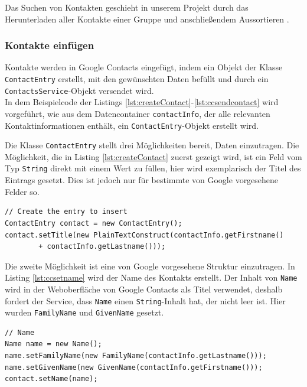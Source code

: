 Das Suchen von Kontakten geschieht in unserem Projekt durch das Herunterladen aller Kontakte
 einer Gruppe und anschließendem Aussortieren .

\FloatBarrier
\subsubsection{Kontakte einf\"ugen}
Kontakte werden in Google Contacts eingefügt, indem ein Objekt der Klasse
 \lstinline{ContactEntry} erstellt, mit den gewünschten Daten befüllt und durch ein
 \lstinline{ContactsService}-Objekt versendet wird.\\
In dem Beispielcode der Listings \ref{lst:createContact}-\ref{lst:ccsendcontact} wird
 vorgeführt, wie aus dem Datencontainer \lstinline{contactInfo}, der alle relevanten
  Kontaktinformationen enthält, ein \lstinline{ContactEntry}-Objekt erstellt wird.

Die Klasse \lstinline{ContactEntry} stellt drei Möglichkeiten bereit, Daten einzutragen.
Die Möglichkeit, die in Listing \ref{lst:createContact} zuerst gezeigt wird, ist ein Feld vom Typ
 \lstinline{String} direkt mit einem Wert zu füllen, hier wird exemplarisch der Titel des Eintrags
 gesetzt.
Dies ist jedoch nur für bestimmte von Google vorgesehene Felder so.

\begin{lstlisting}[float=h!t]
// Create the entry to insert
ContactEntry contact = new ContactEntry();
contact.setTitle(new PlainTextConstruct(contactInfo.getFirstname()
		+ contactInfo.getLastname()));
\end{lstlisting}

Die zweite Möglichkeit ist eine von Google vorgesehene Struktur einzutragen.
In Listing \ref{lst:ccsetname} wird der Name des Kontakts erstellt.
Der Inhalt von \lstinline{Name} wird in der Weboberfläche von Google Contacts als Titel verwendet,
 deshalb fordert der Service, dass \lstinline{Name} einen \lstinline{String}-Inhalt hat, der nicht
 leer ist.
Hier wurden \lstinline{FamilyName} und \lstinline{GivenName} gesetzt.

\begin{lstlisting}[float=h!t]
// Name
Name name = new Name();
name.setFamilyName(new FamilyName(contactInfo.getLastname()));
name.setGivenName(new GivenName(contactInfo.getFirstname()));
contact.setName(name);
\end{lstlisting}

